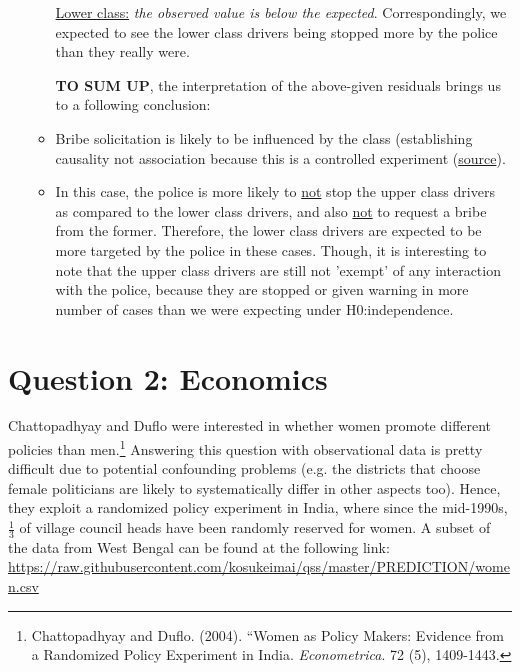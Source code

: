\documentclass[12pt,letterpaper]{article}
\begin{document}
\begin{enumerate}
\begin{itemize}
	\underline{Lower class:} \textit {the observed value is below the expected}. Correspondingly, we expected to see the lower class drivers being stopped more by the police than they really were.
	\vspace{1cm}
	
\textbf{TO SUM UP}, the interpretation of the above-given residuals brings us to a following conclusion:
\item  Bribe solicitation is likely to be influenced by the class (establishing causality not association because this is a controlled experiment (\href{https://www.scribbr.com/frequently-asked-questions/correlational-vs-experimental-research/}{source}).
\item In this case, the police is more likely to \underline{not} stop the upper class drivers as compared to the lower class drivers, and also \underline{not} to request a bribe from the former. Therefore, the lower class drivers are expected to be more targeted by the police in these cases. Though, it is interesting to note that the upper class drivers are still not 'exempt' of any interaction with the police, because they are stopped or given warning in more number of cases than we were expecting under H0:independence.

\end{itemize}


\end{enumerate}
\newpage

\section*{Question 2: Economics}
Chattopadhyay and Duflo were interested in whether women promote different policies than men.\footnote{Chattopadhyay and Duflo. (2004). ``Women as Policy Makers: Evidence from a Randomized Policy Experiment in India. \textit{Econometrica}. 72 (5), 1409-1443.} Answering this question with observational data is pretty difficult due to potential confounding problems (e.g. the districts that choose female politicians are likely to systematically differ in other aspects too). Hence, they exploit a randomized policy experiment in India, where since the mid-1990s, $\frac{1}{3}$ of village council heads have been randomly reserved for women. A subset of the data from West Bengal can be found at the following link: \url{https://raw.githubusercontent.com/kosukeimai/qss/master/PREDICTION/women.csv}\\
\end{document}
